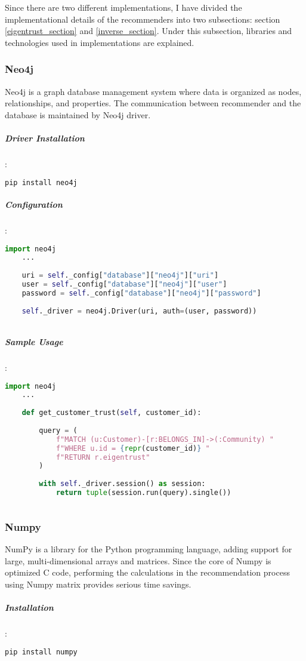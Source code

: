 	Since there are two different implementations, I have divided the implementational details of the recommenders into two subsections: section \ref{eigentrust_section} and \ref{inverse_section}. Under this subsection, libraries and technologies used in implementations are explained.
	\subsubsection{Neo4j \cite{Neo4j}}
	Neo4j is a graph database management system where data is organized as nodes, relationships, and properties. The communication between recommender and the database is maintained by Neo4j driver.
	\subparagraph{Driver Installation}:
	\begin{lstlisting}[language=bash]
	pip install neo4j
	\end{lstlisting}
	
	\subparagraph{Configuration}:
	\begin{lstlisting}[language=python]
	import neo4j
	...
	
	uri = self._config["database"]["neo4j"]["uri"]
	user = self._config["database"]["neo4j"]["user"]
	password = self._config["database"]["neo4j"]["password"]
	
	self._driver = neo4j.Driver(uri, auth=(user, password))
	
	\end{lstlisting}
	
	\subparagraph{Sample Usage}:
	\begin{lstlisting}[language=python, caption=Neo4j driver example]
	import neo4j
	...
	
	def get_customer_trust(self, customer_id):
	
		query = (
			f"MATCH (u:Customer)-[r:BELONGS_IN]->(:Community) "
			f"WHERE u.id = {repr(customer_id)} "
			f"RETURN r.eigentrust"
		)
	
		with self._driver.session() as session:
			return tuple(session.run(query).single())
	
	\end{lstlisting}
	
	\subsubsection{Numpy \cite{Numpy}}
	NumPy is a library for the Python programming language, adding support for large, multi-dimensional arrays and matrices. Since the core of Numpy is optimized C code, performing the calculations in the recommendation process using Numpy matrix provides serious time savings.
	\subparagraph{Installation}:
	\begin{lstlisting}[language=bash]
	pip install numpy
	\end{lstlisting}
	
